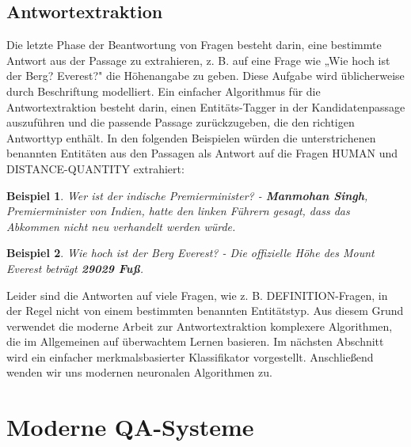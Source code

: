 \documentclass[
        ngerman,
        paper=a4,
        numbers=noendperiod,
]{scrreprt}
\begin{document}
\subsection{Antwortextraktion}
Die letzte Phase der Beantwortung von Fragen besteht darin, eine bestimmte Antwort aus der Passage zu extrahieren, z. B. auf eine Frage wie „Wie hoch ist der Berg? Everest?" die Höhenangabe zu geben. Diese Aufgabe wird üblicherweise durch Beschriftung modelliert. 
Ein einfacher Algorithmus für die Antwortextraktion besteht darin, einen Entitäts-Tagger in der Kandidatenpassage auszuführen und die passende Passage zurückzugeben, die den richtigen Antworttyp enthält. 
In den folgenden Beispielen würden die unterstrichenen benannten Entitäten aus den Passagen als Antwort auf die Fragen HUMAN und DISTANCE-QUANTITY extrahiert:

\newtheorem{example}{Beispiel}

\begin{example}
\glqq Wer ist der indische Premierminister?\grqq{} - \textbf{Manmohan Singh}, Premierminister von Indien, hatte den linken Führern gesagt, dass das Abkommen nicht neu verhandelt werden würde.

\end{example}
\begin{example}
\glqq Wie hoch ist der Berg Everest?\grqq{} - Die offizielle Höhe des Mount Everest beträgt \textbf{29029 Fuß}.
\end{example}

Leider sind die Antworten auf viele Fragen, wie z. B. DEFINITION-Fragen, in der Regel nicht von einem bestimmten benannten Entitätstyp. Aus diesem Grund verwendet die moderne Arbeit zur Antwortextraktion komplexere Algorithmen, die im Allgemeinen auf überwachtem Lernen basieren. Im nächsten Abschnitt wird ein einfacher merkmalsbasierter Klassifikator vorgestellt. Anschließend wenden wir uns modernen neuronalen Algorithmen zu.



\section{Moderne QA-Systeme} %
\end{document}
